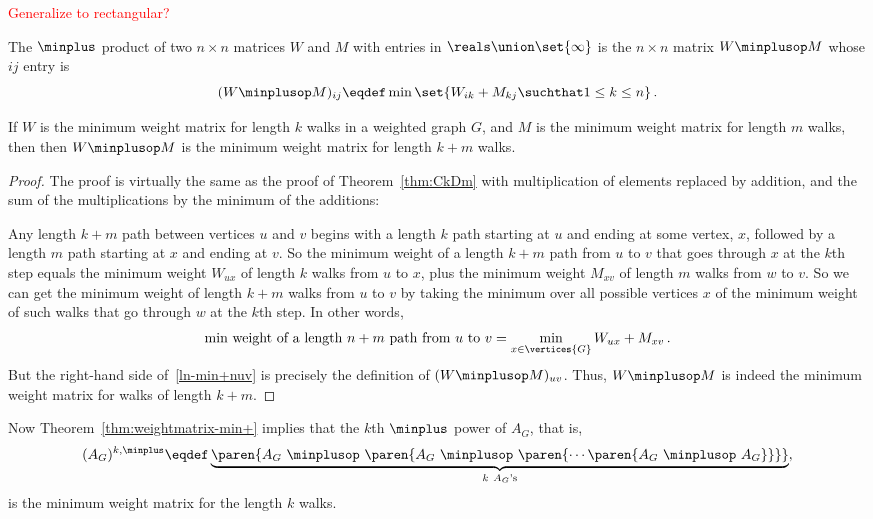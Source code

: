 \begin{editingnotes}
\textcolor{red}{Generalize to rectangular?}

\begin{definition}\label{def:minplus}
  The $\minplus$ product of two $n\times n$ matrices $W$ and $M$ with
  entries in $\reals\union \set{\infty}$ is the $n \times n$ matrix
  $W\minplusop M$ whose $ij$ entry is
\[
(W\minplusop M )_{ij} \eqdef \min \set{W_{ik} + M_{kj} \suchthat 1 \leq k \leq n}\, .
\]
\end{definition}

\begin{theorem}\label{thm:weightmatrix-min+}
  If $W$ is the minimum weight matrix for length $k$ walks in a weighted
  graph $G$, and $M$ is the minimum weight matrix for length $m$ walks,
  then then $W\minplusop M$ is the minimum weight matrix for length $k+m$
  walks.
\end{theorem}

\begin{proof}
  The proof is virtually the same as the proof of Theorem~\ref{thm:CkDm}
  with multiplication of elements replaced by addition, and the sum of the
  multiplications by the minimum of the additions:

  Any length $k+m$ path between vertices $u$ and $v$ begins with a length
  $k$ path starting at $u$ and ending at some vertex, $x$, followed by a
  length $m$ path starting at $x$ and ending at $v$.  So the minimum
  weight of a length $k+m$ path from $u$ to $v$ that goes through $x$ at
  the $k$th step equals the minimum weight $W_{ux}$ of length $k$ walks
  from $u$ to $x$, plus the minimum weight $M_{xv}$ of length $m$ walks
  from $w$ to $v$.  So we can get the minimum weight of length $k+m$ walks
  from $u$ to $v$ by taking the minimum over all possible vertices $x$ of
  the minimum weight of such walks that go through $w$ at the $k$th step.
  In other words,
\begin{equation}\label{ln-min+nuv}
\text{min weight of a length $n+m$ path from $u$ to $v$} =
              \min_{x \in \vertices{G}} W_{ux}+M_{xv}\, .
\end{equation}
But the right-hand side of~\eqref{ln-min+nuv} is precisely the definition of
$(W\minplusop M)_{uv}$.  Thus, $W\minplusop M$ is indeed the minimum weight
matrix for walks of length $k+m$.
\end{proof}

Now Theorem~\ref{thm:weightmatrix-min+} implies that the $k$th $\minplus$ power
of $A_G$, that is,
\[
(A_G)^{k, \minplus} \eqdef \underbrace{\paren{A_G\ \minplusop\ \paren{A_G\
      \minplusop\ \paren{\cdots \paren{A_G\ \minplusop\ A_G}} }}}_{k\ A_G\text{'s}},
\]
is the minimum weight matrix for the length $k$ walks.


\end{editingnotes}
